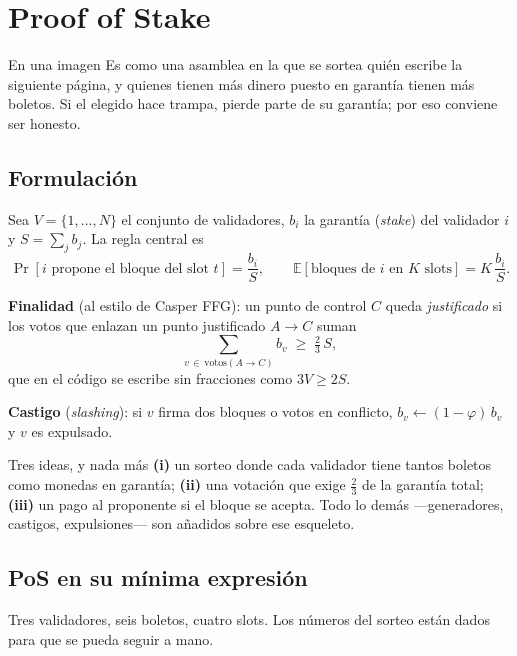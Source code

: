 \documentclass[11pt,a4paper]{article}
\theoremstyle{definition}
\theoremstyle{plain}
\theoremstyle{remark}
\begin{document}
\section{Proof of Stake}\label{sec:pos}

\begin{nota}{En una imagen}
Es como una asamblea en la que se sortea quién escribe la siguiente página, y
quienes tienen más dinero puesto en garantía tienen más boletos. Si el elegido
hace trampa, pierde parte de su garantía; por eso conviene ser honesto.
\end{nota}

\subsection{Formulación}

Sea $V = \{1,\dots,N\}$ el conjunto de validadores, $b_i$ la garantía
(\emph{stake}) del validador $i$ y $S = \sum_j b_j$. La regla central es
\[
  \Pr[i \text{ propone el bloque del slot } t] = \frac{b_i}{S},
  \qquad
  \mathbb{E}[\text{bloques de } i \text{ en } K \text{ slots}] = K\,\frac{b_i}{S}.
\]

\textbf{Finalidad} (al estilo de Casper FFG): un punto de control $C$ queda
\emph{justificado} si los votos que enlazan un punto justificado $A \to C$ suman
\[
  \sum_{v \,\in\, \text{votos}(A \to C)} b_v \;\ge\; \tfrac{2}{3}\,S,
\]
que en el código se escribe sin fracciones como $3V \ge 2S$.

\textbf{Castigo} (\emph{slashing}): si $v$ firma dos bloques o votos en
conflicto, $b_v \leftarrow (1-\varphi)\,b_v$ y $v$ es expulsado.

\begin{clave}{Tres ideas, y nada más}
\textbf{(i)} un sorteo donde cada validador tiene tantos boletos como monedas en
garantía; \textbf{(ii)} una votación que exige $\frac23$ de la garantía total;
\textbf{(iii)} un pago al proponente si el bloque se acepta. Todo lo demás
—generadores, castigos, expulsiones— son añadidos sobre ese esqueleto.
\end{clave}

\subsection{PoS en su mínima expresión}

Tres validadores, seis boletos, cuatro slots. Los números del sorteo están dados
para que se pueda seguir a mano.
\end{document}
